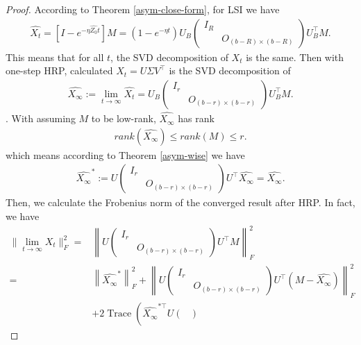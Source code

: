 \begin{proof}
    According to Theorem \ref{asym-close-form}, for LSI we have
    \begin{align}
        \hat{X_t}=\left[I-e^{-\eta \hat{Z_0}t}\right]M=(1-e^{-\eta t})U_B\begin{pmatrix}
            I_R\\&O_{(b-R)\times (b-R)}
        \end{pmatrix}U_B^\top M.
    \end{align}
    This means that for all $t$, the SVD decomposition of $X_t$ is the same. Then with one-step HRP, calculated $X_t=U\Sigma V^\top$ is the SVD decomposition of 
    \begin{align}
        \hat{X_\infty}:=\lim_{t\to\infty}\hat{X_t}=U_B\begin{pmatrix}
            I_r\\&O_{(b-r)\times (b-r)}
        \end{pmatrix}U_B^\top M.
    \end{align}. 
    With assuming $M$ to be low-rank, $\hat{X_\infty}$ has rank
    \begin{align}
        rank(\hat{X_\infty})\leq rank(M)\leq r.
    \end{align}
    which means according to Theorem \ref{asym-wise} we have
    \begin{align}
        \hat{X_\infty}^*:=U\begin{pmatrix}
            I_r\\&O_{(b-r)\times (b-r)}
        \end{pmatrix}U^\top \hat{X_\infty}=\hat{X_\infty}.
    \end{align}
    Then, we calculate the Frobenius norm of the converged result after HRP. In fact, we have
    \begin{align}
        \|\lim_{t\to\infty}X_t\|_F^2=&\left\|U\begin{pmatrix}
            I_r\\&O_{(b-r)\times (b-r)}
        \end{pmatrix}U^\top M\right\|_F^2\\
        =&\left\|\hat{X_\infty}^*\right\|_F^2+\left\|U\begin{pmatrix}
            I_r\\&O_{(b-r)\times (b-r)}
        \end{pmatrix}U^\top (M-\hat{X_\infty})\right\|_F^2\\        &+2\operatorname{Trace}\left(\hat{X_\infty}^{*\top}U\begin{pmatrix}

\end{pmatrix}
\end{align}
\end{proof}
